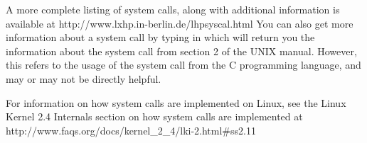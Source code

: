 A more complete listing of system calls, along with additional information
is available at http://www.lxhp.in-berlin.de/lhpsyscal.html
You can also get more information about a system call by typing in 
 which will return you the information 
about the system call from section 2 of the UNIX manual.  However, this 
refers to the usage of the system call from the C programming language, 
and may or may not be directly helpful.

For information on how system calls are implemented on Linux, see the Linux Kernel 2.4 Internals section on how system calls are implemented 
at http://www.faqs.org/docs/kernel\_2\_4/lki-2.html\#ss2.11

